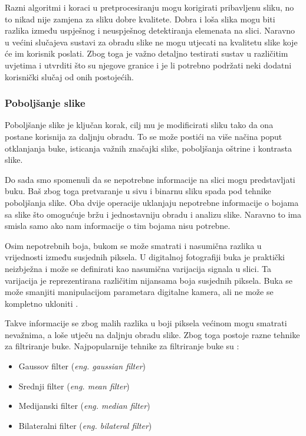 \documentclass{foi}
\begin{document}
Razni algoritmi i koraci u pretprocesiranju mogu korigirati pribavljenu sliku, no to nikad nije zamjena za sliku dobre kvalitete. Dobra i loša slika mogu biti razlika između uspješnog i neuspješnog detektiranja elemenata na slici. Naravno u većini slučajeva sustavi za obradu slike ne mogu utjecati na kvalitetu slike koje će im korisnik poslati. Zbog toga je važno detaljno testirati sustav u različitim uvjetima i utvrditi što su njegove granice i je li potrebno podržati neki dodatni korisnički slučaj od onih postojećih.
\subsubsection{Poboljšanje slike}

Poboljšanje slike je ključan korak, cilj mu je modificirati sliku tako da ona postane korisnija za daljnju obradu. To se može postići na više načina poput otklanjanja buke, isticanja važnih značajki slike, poboljšanja oštrine i kontrasta slike.

Do sada smo spomenuli da se nepotrebne informacije na slici mogu predstavljati buku. Baš zbog toga pretvaranje u sivu i binarnu sliku spada pod tehnike poboljšanja slike. Oba dvije operacije uklanjaju nepotrebne informacije o bojama sa slike što omogućuje bržu i jednostavniju obradu i analizu slike. Naravno to ima smisla samo ako nam informacije o tim bojama nisu potrebne.

Osim nepotrebnih boja, bukom se može smatrati i nasumična razlika u vrijednosti između susjednih piksela. U digitalnoj fotografiji buka je praktički neizbježna i može se definirati kao nasumična varijacija signala u slici. Ta varijacija je reprezentirana različitim nijansama boja susjednih piksela. Buka se može smanjiti manipulacijom parametara digitalne kamera, ali ne može se kompletno ukloniti \cite{Adobe}.

Takve informacije se zbog malih razlika u boji piksela većinom mogu smatrati nevažnima, a loše utječu na daljnju obradu slike. Zbog toga postoje razne tehnike za filtriranje buke. Najpopularnije tehnike za filtriranje buke su \cite{Swain2023Jul}:

\begin{itemize}
    \item Gaussov filter (\textit{eng. gaussian filter})
    \item Srednji filter (\textit{eng. mean filter})
    \item Medijanski filter (\textit{eng. median filter})
    \item Bilateralni filter (\textit{eng. bilateral filter})
\end{itemize}
\end{document}
